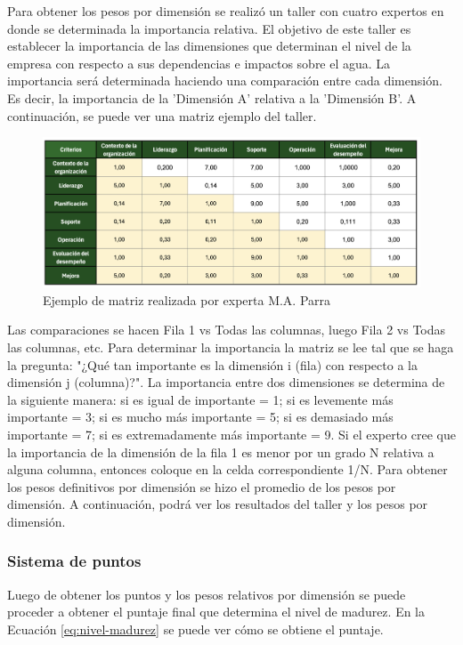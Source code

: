 Para obtener los pesos por dimensión se realizó un taller con cuatro expertos en donde se determinada la importancia relativa. El objetivo de este taller es establecer la importancia de las dimensiones que determinan el nivel de la empresa con respecto a sus dependencias e impactos sobre el agua. La importancia será determinada haciendo una comparación entre cada dimensión. Es decir, la importancia de la 'Dimensión A' relativa a la 'Dimensión B'. A continuación, se puede ver una matriz ejemplo del taller.

\begin{figure}[H]
    \centering
    \includegraphics[scale=0.45]{images/5-implementacion/ejemplo-matriz.png}
    \caption{Ejemplo de matriz realizada por experta M.A. Parra}
    \label{fig:ejemplo-matriz}
\end{figure}

Las comparaciones se hacen Fila 1 vs Todas las columnas, luego Fila 2 vs Todas las columnas, etc.  Para determinar la importancia la matriz se lee tal que se haga la pregunta: "¿Qué tan importante es la dimensión i (fila) con respecto a la dimensión j (columna)?". La importancia entre dos dimensiones se determina de la siguiente manera: si es igual de importante = 1; si es levemente más importante = 3; si es mucho más importante = 5; si es demasiado más importante = 7; si es extremadamente más importante = 9. Si el experto cree que la importancia de la dimensión de la fila 1 es menor por un grado N relativa a alguna columna, entonces coloque en la celda correspondiente 1/N. Para obtener los pesos definitivos por dimensión se hizo el promedio de los pesos por dimensión. A continuación, podrá ver los resultados del taller y los pesos por dimensión.



\subsubsection{Sistema de puntos}
Luego de obtener los puntos y los pesos relativos por dimensión se puede proceder a obtener el puntaje final que determina el nivel de madurez. En la Ecuación \ref{eq:nivel-madurez} se puede ver cómo se obtiene el puntaje.

